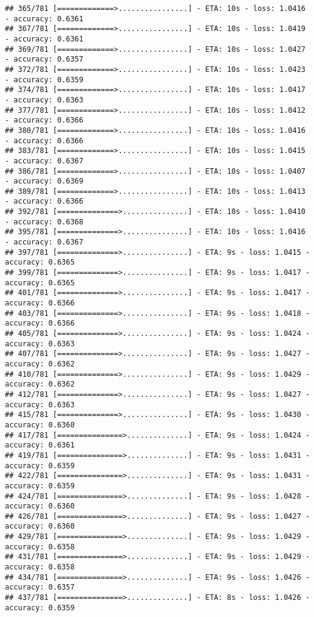 \documentclass[
]{article}
\begin{document}
\begin{verbatim}
## 365/781 [=============>................] - ETA: 10s - loss: 1.0416 - accuracy: 0.6361
## 367/781 [=============>................] - ETA: 10s - loss: 1.0419 - accuracy: 0.6361
## 369/781 [=============>................] - ETA: 10s - loss: 1.0427 - accuracy: 0.6357
## 372/781 [=============>................] - ETA: 10s - loss: 1.0423 - accuracy: 0.6359
## 374/781 [=============>................] - ETA: 10s - loss: 1.0417 - accuracy: 0.6363
## 377/781 [=============>................] - ETA: 10s - loss: 1.0412 - accuracy: 0.6366
## 380/781 [=============>................] - ETA: 10s - loss: 1.0416 - accuracy: 0.6366
## 383/781 [=============>................] - ETA: 10s - loss: 1.0415 - accuracy: 0.6367
## 386/781 [=============>................] - ETA: 10s - loss: 1.0407 - accuracy: 0.6369
## 389/781 [=============>................] - ETA: 10s - loss: 1.0413 - accuracy: 0.6366
## 392/781 [==============>...............] - ETA: 10s - loss: 1.0410 - accuracy: 0.6368
## 395/781 [==============>...............] - ETA: 10s - loss: 1.0416 - accuracy: 0.6367
## 397/781 [==============>...............] - ETA: 9s - loss: 1.0415 - accuracy: 0.6365 
## 399/781 [==============>...............] - ETA: 9s - loss: 1.0417 - accuracy: 0.6365
## 401/781 [==============>...............] - ETA: 9s - loss: 1.0417 - accuracy: 0.6366
## 403/781 [==============>...............] - ETA: 9s - loss: 1.0418 - accuracy: 0.6366
## 405/781 [==============>...............] - ETA: 9s - loss: 1.0424 - accuracy: 0.6363
## 407/781 [==============>...............] - ETA: 9s - loss: 1.0427 - accuracy: 0.6362
## 410/781 [==============>...............] - ETA: 9s - loss: 1.0429 - accuracy: 0.6362
## 412/781 [==============>...............] - ETA: 9s - loss: 1.0427 - accuracy: 0.6363
## 415/781 [==============>...............] - ETA: 9s - loss: 1.0430 - accuracy: 0.6360
## 417/781 [===============>..............] - ETA: 9s - loss: 1.0424 - accuracy: 0.6361
## 419/781 [===============>..............] - ETA: 9s - loss: 1.0431 - accuracy: 0.6359
## 422/781 [===============>..............] - ETA: 9s - loss: 1.0431 - accuracy: 0.6359
## 424/781 [===============>..............] - ETA: 9s - loss: 1.0428 - accuracy: 0.6360
## 426/781 [===============>..............] - ETA: 9s - loss: 1.0427 - accuracy: 0.6360
## 429/781 [===============>..............] - ETA: 9s - loss: 1.0429 - accuracy: 0.6358
## 431/781 [===============>..............] - ETA: 9s - loss: 1.0429 - accuracy: 0.6358
## 434/781 [===============>..............] - ETA: 9s - loss: 1.0426 - accuracy: 0.6357
## 437/781 [===============>..............] - ETA: 8s - loss: 1.0426 - accuracy: 0.6359

\end{verbatim}
\end{document}

